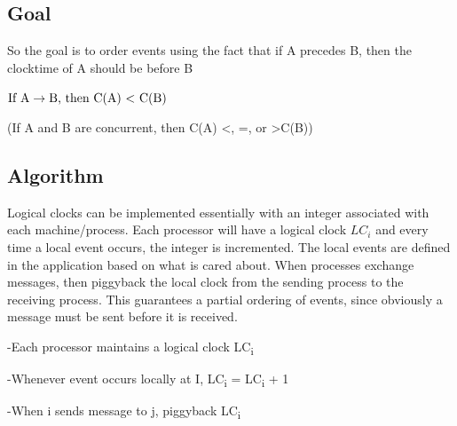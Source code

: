\documentclass[twoside]{article}
\begin{document}
\subsection{Goal}
So the goal is to order events using the fact that if A precedes B, then the clocktime of A should be before B

$\text{If A}\rightarrow\text{B, then C(A) \textless}\text{ C(B)}$

(If A and B are concurrent, then C(A) \textless, =, or \textgreater C(B))

\subsection{Algorithm}
Logical clocks can be implemented essentially with an integer associated with each machine/process. Each processor will have a logical clock $LC_i$ and every time a local event occurs, the integer is incremented. The local events are defined in the application based on what is cared about. When processes exchange messages, then piggyback the local clock from the sending process to the receiving process. This guarantees a partial ordering of events, since obviously a message must be sent before it is received.

-Each processor maintains a logical clock LC\textsubscript{i}

-Whenever event occurs locally at I, LC\textsubscript{i} = LC\textsubscript{i} + 1

-When i sends message to j, piggyback LC\textsubscript{i}
\end{document}
